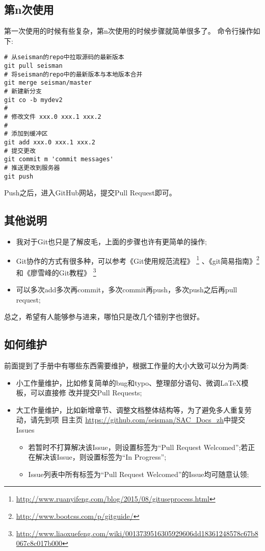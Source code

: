 \subsection{第n次使用}
第一次使用的时候有些复杂，第n次使用的时候步骤就简单很多了。
命令行操作如下:
\begin{verbatim}
# 从seisman的repo中拉取源码的最新版本
git pull seisman
# 将seisman的repo中的最新版本与本地版本合并
git merge seisman/master
# 新建新分支
git co -b mydev2
#
# 修改文件 xxx.0 xxx.1 xxx.2
#
# 添加到缓冲区
git add xxx.0 xxx.1 xxx.2
# 提交更改
git commit ­m 'commit messages'
# 推送更改到服务器
git push
\end{verbatim}
Push之后，进入GitHub网站，提交Pull Request即可。
\subsection{其他说明}
\begin{itemize}
\item 我对于Git也只是了解皮毛，上面的步骤也许有更简单的操作;
\item Git协作的方式有很多种，可以参考《Git使用规范流程》
\footnote{\url{http://www.ruanyifeng.com/blog/2015/08/git­use­process.html}}
、《git简易指南》\footnote{\url{http://www.bootcss.com/p/git­guide/}}
和《廖雪峰的Git教程》
\footnote{\url{http://www.liaoxuefeng.com/wiki/0013739516305929606dd18361248578c67b8067c8c017b000}}
\item 可以多次add多次再commit，多次commit再push，多次push之后再pull request;
\end{itemize}
总之，希望有人能够参与进来，哪怕只是改几个错别字也很好。
\subsection{如何维护}
前面提到了手册中有哪些东西需要维护，根据工作量的大小大致可以分为两类:
\begin{itemize}
\item 小工作量维护，比如修复简单的bug和typo、整理部分语句、微调LaTeX模板，可以直接修
改并提交Pull Requests;
\item 大工作量维护，比如新增章节、调整文档整体结构等，为了避免多人重复劳动，请先到项
目主页 \url{https://github.com/seisman/SAC_Docs_zh}中提交Issues
\begin{itemize}
\item 若暂时不打算解决该Issue，则设置标签为“Pull Request Welcomed”;若正在解决该Issue，则设置标签为“In Progress”;
\item Issue列表中所有标签为“Pull Request Welcomed”的Issue均可随意认领;
\end{itemize}
\end{itemize}

